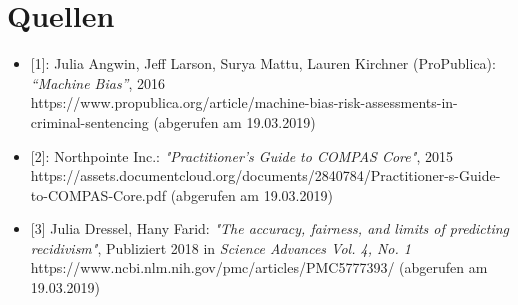 \documentclass[10pt, a4paper, twocolumn]{article} %
\begin{document}
\section{Quellen}
\begin{itemize}
	\item{[1]}: Julia Angwin, Jeff Larson, Surya Mattu, Lauren Kirchner (ProPublica): \textit{“Machine Bias”}, 2016\\  
	         https://www.propublica.org/article/machine-bias-risk-assessments-in-criminal-sentencing (abgerufen am 19.03.2019)

	\item{ [2]}: Northpointe Inc.: \textit{"Practitioner’s Guide to COMPAS Core"}, 2015\\
	 https://assets.documentcloud.org/documents/2840784/Practitioner-s-Guide-to-COMPAS-Core.pdf (abgerufen am 19.03.2019)

	\item  {[3]} Julia Dressel, Hany Farid: \textit{"The accuracy, fairness, and limits of predicting recidivism"}, Publiziert 2018 in \textit{Science Advances Vol. 4, No. 1} \\ 
	       https://www.ncbi.nlm.nih.gov/pmc/articles/PMC5777393/  (abgerufen am 19.03.2019)
\end{itemize}





\printbibliography[title={Bibliography}] %

\end{document}
